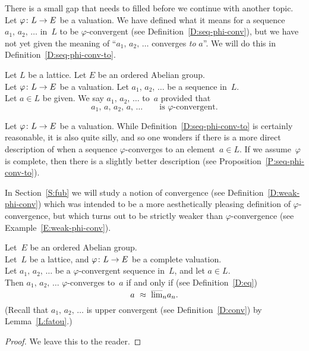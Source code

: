\documentclass[main.tex]{subfiles}
\begin{document}
\noindent
There is a small gap that needs to filled before
we continue with another topic.\\
Let $\varphi\colon L \rightarrow E$ be a valuation.
We have defined what it means
for a sequence $a_1,\,a_2,\,\dotsc$ in~$L$ to be
$\varphi$-convergent
(see Definition~\ref{D:seq-phi-conv}),
but we have not yet given the meaning of
``$a_1,\,a_2,\,\dotsc$ converges \emph{to} $a$''.
We will do this in Definition~\ref{D:seq-phi-conv-to}.
%
%
\begin{dfn}
\label{D:seq-phi-conv-to}
Let $L$ be a lattice.
Let $E$ be an ordered Abelian group.\\
Let $\varphi\colon L\rightarrow E$ be a valuation.
Let $a_1,\,a_2,\,\dotsc$ be a sequence in~$L$.\\
Let $a\in L$ be given.
We say $a_1,\,a_2,\,\dotsc$
 to~$a$
provided that 
\begin{equation*}
a_1,\,a,\,a_2,\,a,\,\dotsc\qquad\text{is $\varphi$-convergent.}
\end{equation*}
\end{dfn}
\begin{rem}
Let $\varphi\colon L \rightarrow E$ be a valuation.
While Definition~\ref{D:seq-phi-conv-to} is certainly reasonable,
it is also quite silly, 
and so one wonders if there is a more direct description
of when a sequence $\varphi$-converges to an element~$a\in L$.
If we assume~$\varphi$ is complete,
then there is a slightly 
better description (see Proposition~\ref{P:seq-phi-conv-to}).

In Section~\ref{S:fub} we will study a notion of convergence
(see Definition~\ref{D:weak-phi-conv})
which was intended to be a more aesthetically pleasing
definition of $\varphi$-convergence,
but which turns out to be strictly weaker 
than $\varphi$-convergence
(see Example~\ref{E:weak-phi-conv}).
\end{rem}
%
%
\begin{prop}
\label{P:seq-phi-conv-to}
Let~$E$ be an ordered Abelian group.\\
Let~$L$ be a lattice, and $\varphi\colon L \rightarrow E$ be a complete valuation.\\
Let $a_1,\,a_2,\,\dotsc$ be a $\varphi$-convergent sequence in~$L$,
and let $a\in L$.\\
Then $a_1,\,a_2,\,\dotsc$
$\varphi$-converges to~$a$
if and only if (see Definition~\ref{D:eq})
\begin{equation*}
a\ \approx\ \ulim{n}a_n.
\end{equation*}
(Recall that
$a_1,\,a_2,\,\dotsc$
is upper convergent
(see Definition~\ref{D:conv})
by Lemma~\ref{L:fatou}.)
\end{prop}
\begin{proof}
We leave this to the reader.
\end{proof}
\end{document}
